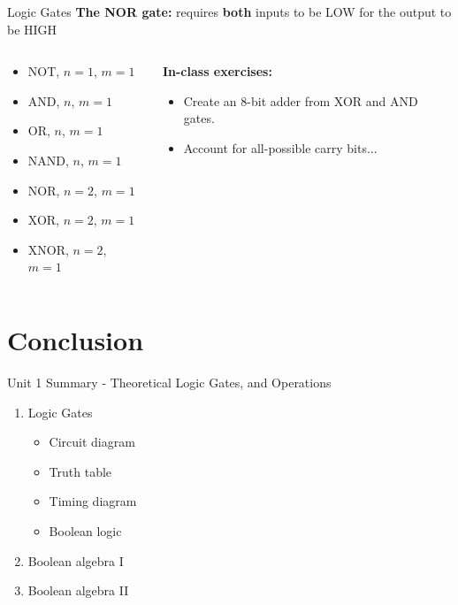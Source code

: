 \documentclass{beamer}
\begin{document}
\begin{frame}{Logic Gates}
\textbf{The NOR gate:} requires \textbf{both} inputs to be LOW for the output to be HIGH \\ \vspace{0.5cm}
\begin{columns}[T]
\begin{column}{0.5\textwidth}
\begin{itemize}
\item \alert{NOT, $n=1$, $m=1$}
\item \alert{AND, $n$, $m=1$}
\item \alert{OR, $n$, $m=1$}
\item \alert{NAND, $n$, $m=1$}
\item \alert{NOR, $n=2$, $m=1$}
\item \alert{XOR, $n=2$, $m=1$}
\item \alert{XNOR, $n=2$, $m=1$}
\end{itemize}
\end{column}
\begin{column}{0.5\textwidth}
\textbf{In-class exercises:}
\begin{itemize}
\item Create an 8-bit adder from XOR and AND gates.
\item Account for all-possible carry bits...
\end{itemize}
\end{column}
\end{columns}
\end{frame}

\section{Conclusion}

\begin{frame}{Unit 1 Summary - Theoretical Logic Gates, and Operations}
\begin{enumerate}
\item Logic Gates
\begin{itemize}
\item Circuit diagram
\item Truth table
\item Timing diagram
\item Boolean logic
\end{itemize}
\item \alert{Boolean algebra I}
\item \alert{Boolean algebra II}
\end{enumerate}
\end{frame}
\end{document}
